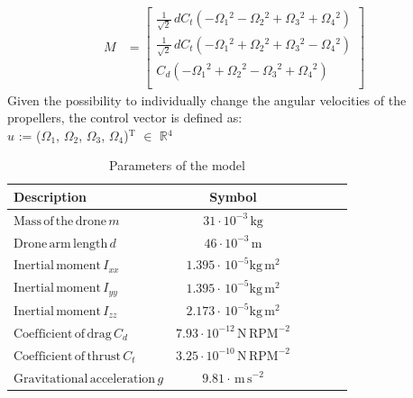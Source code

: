 \documentclass[conference]{IEEEtran}
\begin{document}
\begin{align*}
	M &=
	\begin{bmatrix}
		\frac{1}{\sqrt{2}}\,dC_t(-\Omega_1\mathrm{^{2}} - \Omega_2\mathrm{^{2}} + \Omega_3\mathrm{^{2}} + \Omega_4\mathrm{^{2}})\\
		\frac{1}{\sqrt{2}}\,dC_t(-\Omega_1\mathrm{^{2}} + \Omega_2\mathrm{^{2}} + \Omega_3\mathrm{^{2}} - \Omega_4\mathrm{^{2}})\\
		C_d(-\Omega_1\mathrm{^{2}} + \Omega_2\mathrm{^{2}} - \Omega_3\mathrm{^{2}} + \Omega_4\mathrm{^{2}})\\
	\end{bmatrix}
\end{align*}
Given the possibility to individually change the angular velocities of the propellers, the control vector is defined as: \\                          
$u$ := ($\Omega_{1}$, $\Omega_{2}$, $\Omega_{3}$, $\Omega_{4}$)$\mathrm{^{T}}$ $\in$ $\mathbb{R}\mathrm{^{4}}$

\begin{table}[htbp]
	\small
	\begin{center}
		\begin{tabular}{lccccl}\toprule
			\textbf{Description} &  \textbf{Symbol}\\
			\midrule
            $\mathrm{Mass\,of\,the\,drone} \,m$ & $\mathrm{31 \cdot 10^{-3}\,\mathrm{kg}}$  \\
			$\mathrm{Drone\,arm\,length} \,d$ & $46 \cdot \mathrm{10^{-3}}\,\mathrm{m}$ \\
			$\mathrm{Inertial\,moment} \,I_{xx}$ & $1.395 \cdot\,\mathrm{10^{-5}} \mathrm{kg\,m^2}$ \\
            $\mathrm{Inertial\,moment} \,I_{yy}$ & $1.395 \cdot\,\mathrm{10^{-5}} \mathrm{kg\,m^2}$ \\
            $\mathrm{Inertial\,moment} \,I_{zz}$ & $2.173 \cdot\,\mathrm{10^{-5}} \mathrm{kg\,m^2}$ \\
            $\mathrm{Coefficient\,of\,drag} \,C_d$ & $\mathrm{7.93 \cdot 10^{-12}}\,\mathrm{N\,RPM^{-2}}$ \\
			$\mathrm{Coefficient\,of\,thrust} \,C_t$ & $\mathrm{3.25 \cdot 10^{-10}}\,\mathrm{N\,RPM^{-2}}$ \\
			$\mathrm{Gravitational\,acceleration} \,g$ & $\mathrm{9.81 \cdot\,m\,s^{-2}}$ \\
			\bottomrule
		\end{tabular}
	\end{center}
	\caption{Parameters of the model}
	\label{table1}
\end{table}
\end{document}
